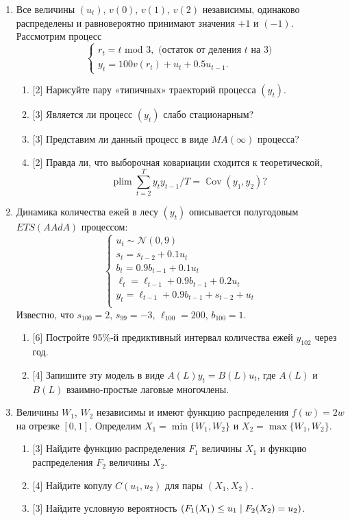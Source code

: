 \documentclass[12pt]{article}
\DeclareMathOperator{\Cov}{\mathbb{C}ov}
\let\P\relax
\DeclareMathOperator{\P}{\mathbb{P}}
\DeclareMathOperator{\plim}{plim}
\newcommand{\cN}{\mathcal{N}}
\begin{document}
\begin{enumerate}
    \item Все величины $(u_t)$, $v(0)$, $v(1)$, $v(2)$ независимы, одинаково распределены и равновероятно принимают значения $+1$ и $(-1)$.
    Рассмотрим процесс 
    \[
    \begin{cases} 
        r_t = t \text{ mod } 3, \text{ (остаток от деления }t \text{ на 3)} \\
        y_t = 100 v(r_t) + u_t + 0.5u_{t-1}.   
    \end{cases}
    \]
    \begin{enumerate}
        \item {[2]} Нарисуйте пару «типичных» траекторий процесса $(y_t)$. 
        \item {[3]} Является ли процесс $(y_t)$ слабо стационарным?
        \item {[3]} Представим ли данный процесс в виде $MA(\infty)$ процесса?
        \item {[2]} Правда ли, что выборочная ковариации сходится к теоретической,
        \[
        \plim \sum_{t=2}^T y_t y_{t-1} / T = \Cov(y_1, y_2)?
        \]
    \end{enumerate}

    \item Динамика количества ежей в лесу $(y_t)$ описывается полугодовым $ETS(AAdA)$ процессом:
    \[
    \begin{cases}
        u_t \sim \cN(0, 9) \\
        s_t = s_{t-2} + 0.1 u_t \\
        b_t = 0.9b_{t-1} + 0.1 u_t \\
        \ell_t = \ell_{t-1} + 0.9b_{t-1} + 0.2 u_t \\
        y_t = \ell_{t-1} + 0.9b_{t-1} + s_{t-2} + u_t \\
    \end{cases}    
    \]
    Известно, что $s_{100} = 2$, $s_{99} = -3$, $\ell_{100} = 200$, $b_{100} = 1$.
    \begin{enumerate}
      \item {[6]} Постройте 95\%-й предиктивный интервал количества ежей $y_{102}$ через год.
      \item {[4]} Запишите эту модель в виде $A(L) y_t = B(L) u_t$, где $A(L)$ и $B(L)$ взаимно-простые лаговые многочлены.
    \end{enumerate}
  
    \item Величины $W_1$, $W_2$ независимы и имеют функцию распределения $f(w) = 2w$ на отрезке $[0, 1]$.
    Определим $X_1 = \min \{W_1, W_2\}$ и $X_2 = \max \{W_1, W_2\}$.
    \begin{enumerate}
        \item {[3]} Найдите функцию распределения $F_1$ величины $X_1$ и функцию распределения $F_2$ величины $X_2$.
        \item {[4]} Найдите копулу $C(u_1, u_2)$ для пары $(X_1, X_2)$.
        \item {[3]} Найдите условную вероятность $\P(F_1(X_1) \leq u_1 \mid F_2(X_2) = u_2)$.
    \end{enumerate}


\end{enumerate}
\end{document}
